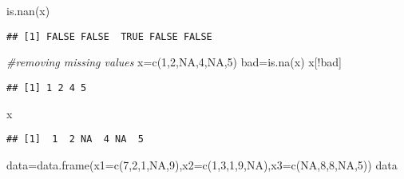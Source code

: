 \documentclass[
]{article}
\newenvironment{Shaded}{\begin{snugshade}}{\end{snugshade}}
\newcommand{\AttributeTok}[1]{\textcolor[rgb]{0.77,0.63,0.00}{#1}}
\newcommand{\CommentTok}[1]{\textcolor[rgb]{0.56,0.35,0.01}{\textit{#1}}}
\newcommand{\ConstantTok}[1]{\textcolor[rgb]{0.00,0.00,0.00}{#1}}
\newcommand{\DecValTok}[1]{\textcolor[rgb]{0.00,0.00,0.81}{#1}}
\newcommand{\FunctionTok}[1]{\textcolor[rgb]{0.00,0.00,0.00}{#1}}
\newcommand{\NormalTok}[1]{#1}
\newcommand{\OtherTok}[1]{\textcolor[rgb]{0.56,0.35,0.01}{#1}}
\newcommand{\SpecialCharTok}[1]{\textcolor[rgb]{0.00,0.00,0.00}{#1}}
\begin{document}
\begin{Shaded}
\begin{Highlighting}[]
\FunctionTok{is.nan}\NormalTok{(x)}
\end{Highlighting}
\end{Shaded}

\begin{verbatim}
## [1] FALSE FALSE  TRUE FALSE FALSE
\end{verbatim}

\begin{Shaded}
\begin{Highlighting}[]
\CommentTok{\#removing missing values}
\NormalTok{x}\OtherTok{=}\FunctionTok{c}\NormalTok{(}\DecValTok{1}\NormalTok{,}\DecValTok{2}\NormalTok{,}\ConstantTok{NA}\NormalTok{,}\DecValTok{4}\NormalTok{,}\ConstantTok{NA}\NormalTok{,}\DecValTok{5}\NormalTok{)}
\NormalTok{bad}\OtherTok{=}\FunctionTok{is.na}\NormalTok{(x)}
\NormalTok{x[}\SpecialCharTok{!}\NormalTok{bad]}
\end{Highlighting}
\end{Shaded}

\begin{verbatim}
## [1] 1 2 4 5
\end{verbatim}

\begin{Shaded}
\begin{Highlighting}[]
\NormalTok{x}
\end{Highlighting}
\end{Shaded}

\begin{verbatim}
## [1]  1  2 NA  4 NA  5
\end{verbatim}

\begin{Shaded}
\begin{Highlighting}[]
\NormalTok{data}\OtherTok{=}\FunctionTok{data.frame}\NormalTok{(}\AttributeTok{x1=}\FunctionTok{c}\NormalTok{(}\DecValTok{7}\NormalTok{,}\DecValTok{2}\NormalTok{,}\DecValTok{1}\NormalTok{,}\ConstantTok{NA}\NormalTok{,}\DecValTok{9}\NormalTok{),}\AttributeTok{x2=}\FunctionTok{c}\NormalTok{(}\DecValTok{1}\NormalTok{,}\DecValTok{3}\NormalTok{,}\DecValTok{1}\NormalTok{,}\DecValTok{9}\NormalTok{,}\ConstantTok{NA}\NormalTok{),}\AttributeTok{x3=}\FunctionTok{c}\NormalTok{(}\ConstantTok{NA}\NormalTok{,}\DecValTok{8}\NormalTok{,}\DecValTok{8}\NormalTok{,}\ConstantTok{NA}\NormalTok{,}\DecValTok{5}\NormalTok{))}
\NormalTok{data}
\end{Highlighting}
\end{Shaded}
\end{document}
